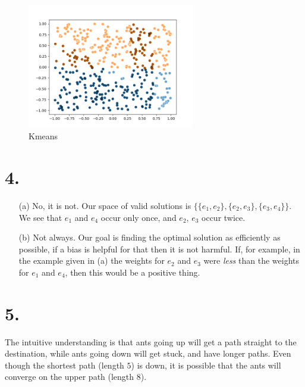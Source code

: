 \documentclass{scrartcl}
\begin{document}
\begin{itemize}
    \begin{figure}
      \centering
      \includegraphics[width=0.65\textwidth]{3/k_means.png}
      \caption{Kmeans}
      \label{fig:3b}
    \end{figure}

\end{itemize}

\section*{4.}

\begin{itemize}

  \item[(a)]
    No, it is not. Our space of valid solutions is $\{\{e_1, e_2\}, \{e_2,
    e_3\}, \{e_3, e_4\}\}$. We see that $e_1$ and $e_4$ occur only once,
    and $e_2$, $e_3$ occur twice.

  \item[(b)]
    Not always. Our goal is finding the optimal solution as efficiently as
    possible, if a bias is helpful for that then it is not harmful. If,
    for example, in the example given in (a) the weights for $e_2$ and
    $e_3$ were \emph{less} than the weights for $e_1$ and $e_4$, then this
    would be a positive thing.

\end{itemize}

\section*{5.}
The intuitive understanding is that ants going up will get a path straight
to the destination, while ants going down will get stuck, and have longer
paths. Even though the shortest path (length $5$) is down, it is possible
that the ants will converge on the upper path (length $8$).
\end{document}
